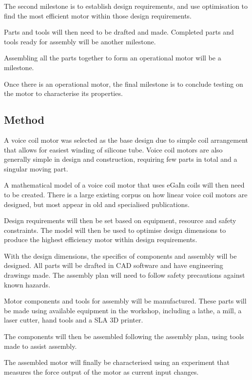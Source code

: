 \documentclass[a4paper,12pt]{article}
\begin{document}
The second milestone is to establish design requirements, and use optimisation to find the most efficient motor within those design requirements.

Parts and tools will then need to be drafted and made. Completed parts and tools ready for assembly will be another milestone.

Assembling all the parts together to form an operational motor will be a milestone.

Once there is an operational motor, the final milestone is to conclude testing on the motor to characterise its properties.

\subsection{Method}
A voice coil motor was selected as the base design due to simple coil arrangement that allows for easiest winding of silicone tube. Voice coil motors are also generally simple in design and construction, requiring few parts in total and a singular moving part.

A mathematical model of a voice coil motor that uses eGaIn coils will then need to be created. There is a large existing corpus on how linear voice coil motors are designed, but most appear in old and specialised publications.

Design requirements will then be set based on equipment, resource and safety constraints. The model will then be used to optimise design dimensions to produce the highest efficiency motor within design requirements.

With the design dimensions, the specifics of components and assembly will be designed. All parts will be drafted in CAD software and have engineering drawings made. The assembly plan will need to follow safety precautions against known hazards.

Motor components and tools for assembly will be manufactured. These parts will be made using available equipment in the workshop, including a lathe, a mill, a laser cutter, hand tools and a SLA 3D printer.

The components will then be assembled following the assembly plan, using tools made to assist assembly.

The assembled motor will finally be characterised using an experiment that measures the force output of the motor as current input changes.

\newpage

\printbibliography
\end{document}
